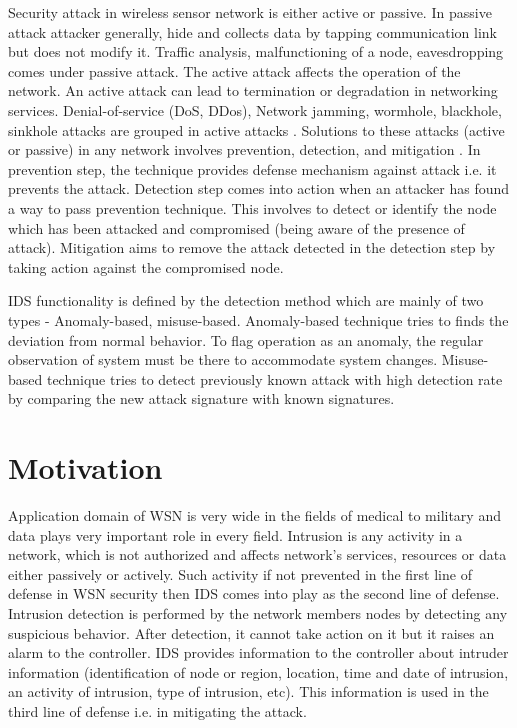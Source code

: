Security attack in wireless sensor network is either active or passive. In passive attack attacker generally, hide and collects data by tapping communication link but does not modify it. Traffic analysis, malfunctioning of a node, eavesdropping comes under passive attack. The active attack affects the operation of the network. An active attack can lead to termination or degradation in networking services. Denial-of-service (DoS, DDos), Network jamming, wormhole, blackhole, sinkhole attacks are grouped in active attacks \cite{padmavathi2009survey}. Solutions to these attacks (active or passive) in any network involves prevention, detection, and mitigation \cite{fuchsberger2005intrusion}. In prevention step, the technique provides defense mechanism against attack i.e. it prevents the attack. Detection step comes into action when an attacker has found a way to pass prevention technique. This involves to detect or identify the node which has been attacked and compromised (being aware of the presence of attack). Mitigation aims to remove the attack detected in the detection step by taking action against the compromised node.
\par
IDS functionality is defined by the detection method which are mainly of two types - Anomaly-based, misuse-based. Anomaly-based technique tries to finds the deviation from normal behavior. To flag operation as an anomaly, the regular observation of system must be there to accommodate system changes. Misuse-based technique tries to detect previously known attack with high detection rate by comparing the new attack signature with known signatures.
\section{Motivation}
Application domain of WSN is very wide in the fields of medical to military and data plays very important role in every field. Intrusion is any activity in a network, which is not authorized and affects network's services, resources or data either passively or actively. Such activity if not prevented in the first line of defense in WSN security then IDS comes into play as the second line of defense. Intrusion detection is performed by the network members nodes by detecting any suspicious behavior. After detection, it cannot take action on it but it raises an alarm to the controller. IDS provides information to the controller about intruder information (identification of node or region, location, time and date of intrusion, an activity of intrusion, type of intrusion, etc). This information is used in the third line of defense i.e. in mitigating the attack.


